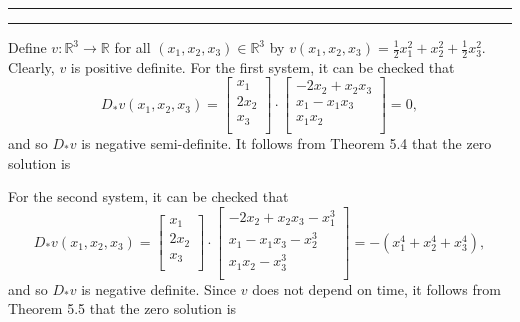 \documentclass[11pt]{article}
\newcounter{questionCounter}
\newcounter{partCounter}[questionCounter]
\newenvironment{question}[2][\arabic{questionCounter}]{%
    \setcounter{partCounter}{0}%
    \vspace{.25in} \hrule \vspace{0.5em}%
        \noindent{\bf #2}%
    \vspace{0.8em} \hrule \vspace{.10in}%
    \addtocounter{questionCounter}{1}%
}{}
\newcommand{\R}{\mathbb{R}} %
\begin{document}
\begin{question}{Problem 2}
Define $v : \R^3 \rightarrow \R$ for all $(x_1,x_2,x_3) \in \R^3$ by
$v(x_1,x_2,x_3) = \frac12x_1^2 + x_2^2 + \frac12x_3^2$.
Clearly, $v$ is positive definite. For the first system, it can be checked that
\[D_*v(x_1,x_2,x_3)
    =
        \begin{bmatrix}
            x_1     \\
            2x_2    \\
            x_3     \\
        \end{bmatrix}
    \cdot
        \begin{bmatrix}
            -2x_2 + x_2x_3  \\
            x_1 - x_1x_3    \\
            x_1x_2          \\
        \end{bmatrix}
    = 0,
\]
and so $D_*v$ is negative semi-definite. It follows from Theorem 5.4 that the
zero solution is 

For the second system, it can be checked that
\[D_*v(x_1,x_2,x_3)
    =
        \begin{bmatrix}
            x_1     \\
            2x_2    \\
            x_3     \\
        \end{bmatrix}
    \cdot
        \begin{bmatrix}
            -2x_2 + x_2x_3 - x_1^3  \\
            x_1 - x_1x_3 - x_2^3    \\
            x_1x_2 - x_3^3          \\
        \end{bmatrix}
    = -(x_1^4 + x_2^4 + x_3^4),
\]
and so $D_*v$ is negative definite. Since $v$ does not depend on time,
it follows from Theorem 5.5 that the zero solution is 
\end{question}
\end{document}
